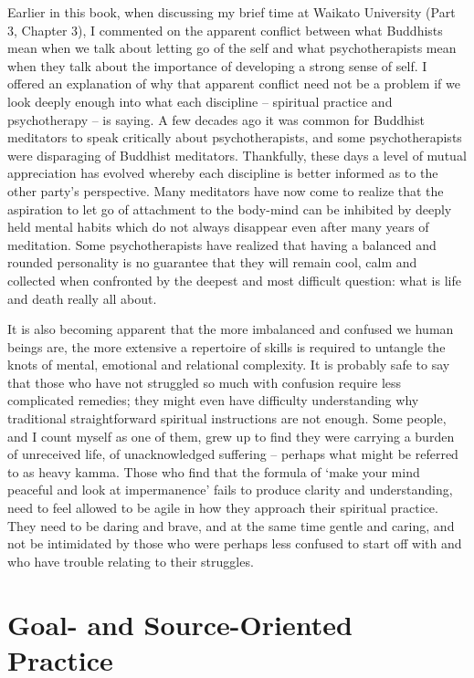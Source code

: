 Earlier in this book, when discussing my brief time at Waikato
University (Part 3, Chapter 3), I commented on the apparent conflict
between what Buddhists mean when we talk about letting go of the self
and what psychotherapists mean when they talk about the importance of
developing a strong sense of self. I offered an explanation of why that
apparent conflict need not be a problem if we look deeply enough into
what each discipline -- spiritual practice and psychotherapy -- is
saying. A few decades ago it was common for Buddhist meditators to speak
critically about psychotherapists, and some psychotherapists were
disparaging of Buddhist meditators. Thankfully, these days a level of
mutual appreciation has evolved whereby each discipline is better
informed as to the other party's perspective. Many meditators have now
come to realize that the aspiration to let go of attachment to the
body-mind can be inhibited by deeply held mental habits which do not
always disappear even after many years of meditation. Some
psychotherapists have realized that having a balanced and rounded
personality is no guarantee that they will remain cool, calm and
collected when confronted by the deepest and most difficult question:
what is life and death really all about.

It is also becoming apparent that the more imbalanced and confused we
human beings are, the more extensive a repertoire of skills is required
to untangle the knots of mental, emotional and relational complexity. It
is probably safe to say that those who have not struggled so much with
confusion require less complicated remedies; they might even have
difficulty understanding why traditional straightforward spiritual
instructions are not enough. Some people, and I count myself as one of
them, grew up to find they were carrying a burden of unreceived life, of
unacknowledged suffering -- perhaps what might be referred to as heavy
kamma. Those who find that the formula of `make your mind peaceful and
look at impermanence' fails to produce clarity and understanding, need
to feel allowed to be agile in how they approach their spiritual
practice. They need to be daring and brave, and at the same time gentle
and caring, and not be intimidated by those who were perhaps less
confused to start off with and who have trouble relating to their
struggles.

\section{Goal- and Source-Oriented Practice}

